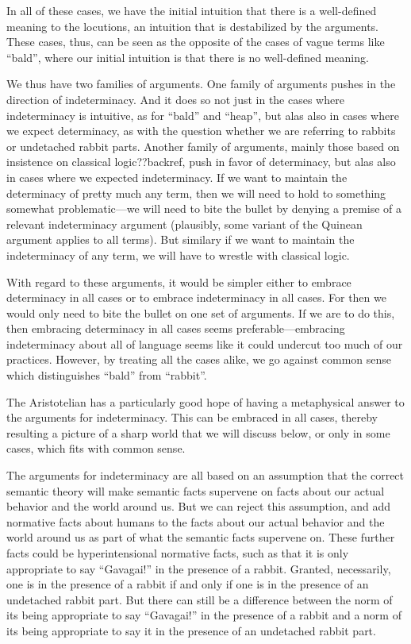 In all of these cases, we have the initial intuition that there is a well-defined meaning to the locutions, an intuition that
is destabilized by the arguments. These cases, thus, can be seen as the opposite of the cases of vague terms like ``bald'', where
our initial intuition is that there is no well-defined meaning.

We thus have two families of arguments. One family of arguments pushes in the direction of indeterminacy. And it does so not
just in the cases where indeterminacy is intuitive, as for ``bald'' and ``heap'', but alas also in cases where we expect determinacy,
as with the question whether we are referring to rabbits or undetached rabbit parts. Another family of arguments, mainly those
based on insistence on classical logic??backref, push in favor of determinacy, but alas also in cases where we expected indeterminacy.
If we want to maintain the determinacy of pretty much any term, then we will need to hold to something somewhat problematic---we will
need to bite the bullet by denying a premise of a relevant indeterminacy argument (plausibly, some variant of the Quinean argument 
applies to all terms). But similary if we want to maintain the indeterminacy of any term, we will have to wrestle with classical
logic. 

With regard to these arguments, it would be simpler either to embrace determinacy in all cases or to embrace indeterminacy in all 
cases. For then we would only need to bite the bullet on one set of arguments. If we are to do this, then embracing determinacy in
all cases seems preferable---embracing indeterminacy about all of language seems like it could undercut too much of our practices.
However, by treating all the cases alike, we go against common sense which distinguishes ``bald'' from ``rabbit''. 

The Aristotelian has a particularly good hope of having a metaphysical answer to the arguments for indeterminacy. This can be embraced
in all cases, thereby resulting a picture of a sharp world that we will discuss below, or only in some cases, which fits with 
common sense. 

The arguments for indeterminacy are all based on an assumption that the correct semantic theory will make semantic facts supervene on
facts about our actual behavior and the world around us. But we can reject this assumption, and add normative facts about humans 
to the facts about our actual behavior and the world around us as part of what the semantic facts supervene on. These further
facts could be hyperintensional normative
facts, such as that it is only appropriate to say ``Gavagai!'' in the presence of a rabbit. Granted, necessarily, one is in the
presence of a rabbit if and only if one is in the presence of an undetached rabbit part. But there can still be a difference between
the norm of its being appropriate to say ``Gavagai!'' in the presence of a rabbit and a norm of its being appropriate to say it 
in the presence of an undetached rabbit part.

